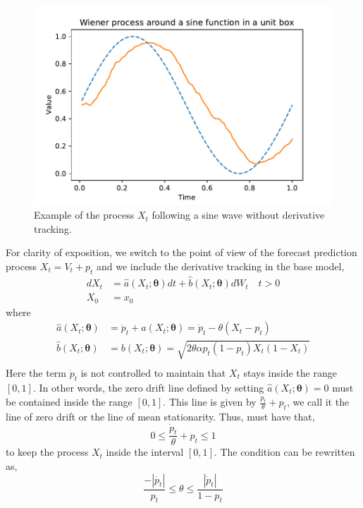 \documentclass[10pt,twocolumn,letterpaper]{article}
\begin{document}
\begin{figure}[t]
\begin{center}
   \includegraphics[width=0.8\linewidth]{conv_sine_shift.pdf}
\end{center}
   \caption{Example of the process $X_t$ following a sine wave without derivative tracking.}
\label{fig:long}
\label{fig:onecol}
\label{sine_wave_shift}
\end{figure}

For clarity of exposition, we switch to the point of view of the forecast prediction process $X_t = V_t + p_t$ and we include the derivative tracking in the base model,
\begin{equation}
\begin{split}
dX_t &= \hat{a}(X_t; \bm{\theta}) dt + \hat{b} (X_t; \bm{\theta} ) dW_t \quad t > 0 \\
X_0 & = x_0
\end{split}\label{main_X}
\end{equation}
where 
\begin{equation}
\begin{split}
\hat{a}(X_t; \bm{\theta}) &= \dot{p}_t + a(X_t; \bm{\theta}) =  \dot{p}_t - \theta \left(X_t - p_t\right)   \\
\hat{b}(X_t; \bm{\theta}) &=  b(X_t; \bm{\theta}) =  \sqrt{2 \theta \alpha p_t(1-p_t) X_t (1-X_t)}    \\
\end{split}
\end{equation}
Here the term $\dot{p}_t $ is not controlled to maintain that $X_t$ stays inside the range $[0,1]$. In other words, the zero drift line defined by  setting $\hat{a}(X_t; \bm{\theta}) =0$ must  be contained inside the range $[0,1]$. This line is given by   $ \frac{\dot{p}_t}{\theta}  + p_t $, we call it the line of zero drift or  the line of mean stationarity.
Thus, must have that, 
\begin{equation}
 0 \leq  \frac{\dot{p}_t}{\theta}  + p_t  \leq 1
\end{equation}
to keep the process $X_t$ inside the interval $[0,1]$.
The condition  can be rewritten as, 
\begin{equation}
\frac{- |\dot{p_t}|}{p_t} \leq \theta \leq \frac{|\dot{p}_t|}{1- p_t}
\end{equation}
\end{document}

